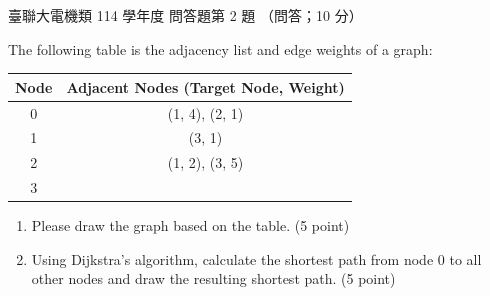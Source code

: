 \begin{pastexam}[label={px:ust-114-ee-ds-26}]{臺聯大電機類 114 學年度 問答題第 2 題}
（問答；10 分）

The following table is the adjacency list and edge weights of a graph:
\begin{center}
\begin{tabular}{|c|c|}
\hline
Node & Adjacent Nodes (Target Node, Weight) \\ \hline
0 & (1, 4), (2, 1) \\ \hline
1 & (3, 1) \\ \hline
2 & (1, 2), (3, 5) \\ \hline
3 & \\ \hline
\end{tabular}
\end{center}
\begin{enumerate}[label=(\Alph*)]
\item Please draw the graph based on the table. (5 point)
\item Using Dijkstra's algorithm, calculate the shortest path from node 0 to all other nodes and draw
the resulting shortest path. (5 point)
\end{enumerate}
\end{pastexam}

